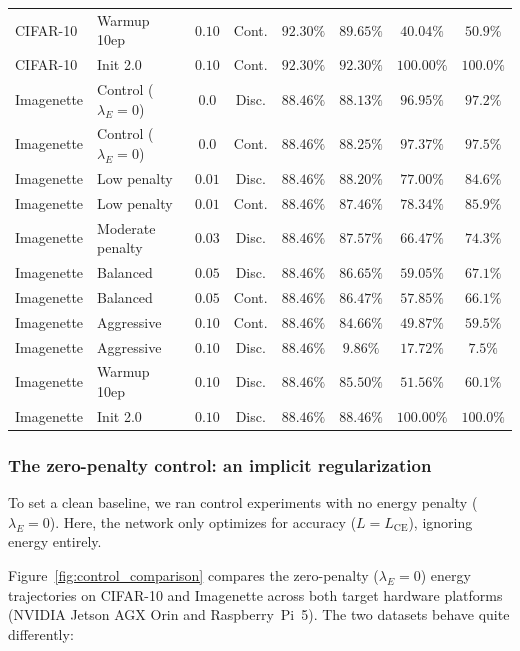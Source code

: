 \begin{table}
{\begin{tabular}{llcccccc}
CIFAR-10 & Warmup 10ep & $0.10$ & Cont. & $92.30\%$ & $89.65\%$ & $40.04\%$ & $50.9\%$ \\
CIFAR-10 & Init 2.0 & $0.10$ & Cont. & $92.30\%$ & $92.30\%$ & $100.00\%$ & $100.0\%$ \\
\midrule
Imagenette & Control ($\lambda_E=0$) & $0.0$ & Disc. & $88.46\%$ & $88.13\%$ & $96.95\%$ & $97.2\%$ \\
Imagenette & Control ($\lambda_E=0$) & $0.0$ & Cont. & $88.46\%$ & $88.25\%$ & $97.37\%$ & $97.5\%$ \\
Imagenette & Low penalty & $0.01$ & Disc. & $88.46\%$ & $88.20\%$ & $77.00\%$ & $84.6\%$ \\
Imagenette & Low penalty & $0.01$ & Cont. & $88.46\%$ & $87.46\%$ & $78.34\%$ & $85.9\%$ \\
Imagenette & Moderate penalty & $0.03$ & Disc. & $88.46\%$ & $87.57\%$ & $66.47\%$ & $74.3\%$ \\
Imagenette & Balanced & $0.05$ & Disc. & $88.46\%$ & $86.65\%$ & $59.05\%$ & $67.1\%$ \\
Imagenette & Balanced & $0.05$ & Cont. & $88.46\%$ & $86.47\%$ & $57.85\%$ & $66.1\%$ \\
Imagenette & Aggressive & $0.10$ & Cont. & $88.46\%$ & $84.66\%$ & $49.87\%$ & $59.5\%$ \\
Imagenette & Aggressive & $0.10$ & Disc. & $88.46\%$ & $\mathbf{9.86\%}$ & $17.72\%$ & $7.5\%$ \\
Imagenette & Warmup 10ep & $0.10$ & Disc. & $88.46\%$ & $85.50\%$ & $51.56\%$ & $60.1\%$ \\
Imagenette & Init 2.0 & $0.10$ & Disc. & $88.46\%$ & $88.46\%$ & $100.00\%$ & $100.0\%$ \\
\bottomrule
\end{tabular}%
}
\end{table}

\subsubsection{The zero-penalty control: an implicit regularization}

To set a clean baseline, we ran control experiments with no energy penalty ($\lambda_E = 0$). Here, the network only optimizes for accuracy ($L = L_{\text{CE}}$), ignoring energy entirely.

Figure~\ref{fig:control_comparison} compares the zero-penalty ($\lambda_E = 0$) energy trajectories on CIFAR-10 and Imagenette across both target hardware platforms (NVIDIA Jetson AGX Orin and Raspberry~Pi~5). The two datasets behave quite differently:

